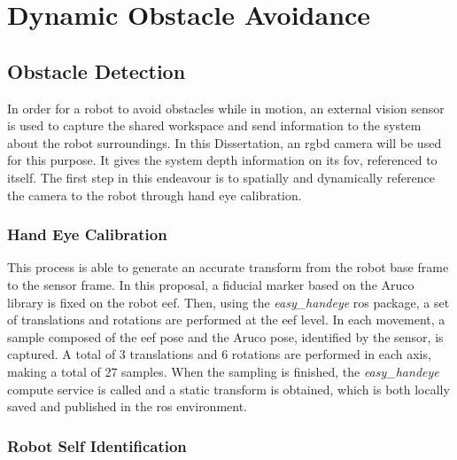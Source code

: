 \chapter{Dynamic Obstacle Avoidance}
\label{chapter:obstacle}

\section{Obstacle Detection}
\label{section:obstacle-detection}

\par In order for a robot to avoid obstacles while in motion, an external vision sensor is used to capture the shared workspace and send information to the system about the robot surroundings. In this Dissertation, an \ac{rgbd} camera will be used for this purpose. It gives the system depth information on its \ac{fov}, referenced to itself. The first step in this endeavour is to spatially and dynamically reference the camera to the robot through hand eye calibration. 

\subsection{Hand Eye Calibration}

\par This process is able to generate an accurate transform from the robot base frame to the sensor frame. In this proposal, a fiducial marker based on the Aruco library \cite{aruco} is fixed on the robot \ac{eef}. Then, using the \textit{easy\_handeye} \ac{ros} package, a set of translations and rotations are performed at the \ac{eef} level. In each movement, a sample composed of the \ac{eef} pose and the Aruco pose, identified by the sensor, is captured. A total of 3 translations and 6 rotations are performed in each axis, making a total of 27 samples. When the sampling is finished, the \textit{easy\_handeye} compute service is called and a static transform is obtained, which is both locally saved and published in the \ac{ros} environment.


\subsection{Robot Self Identification}


